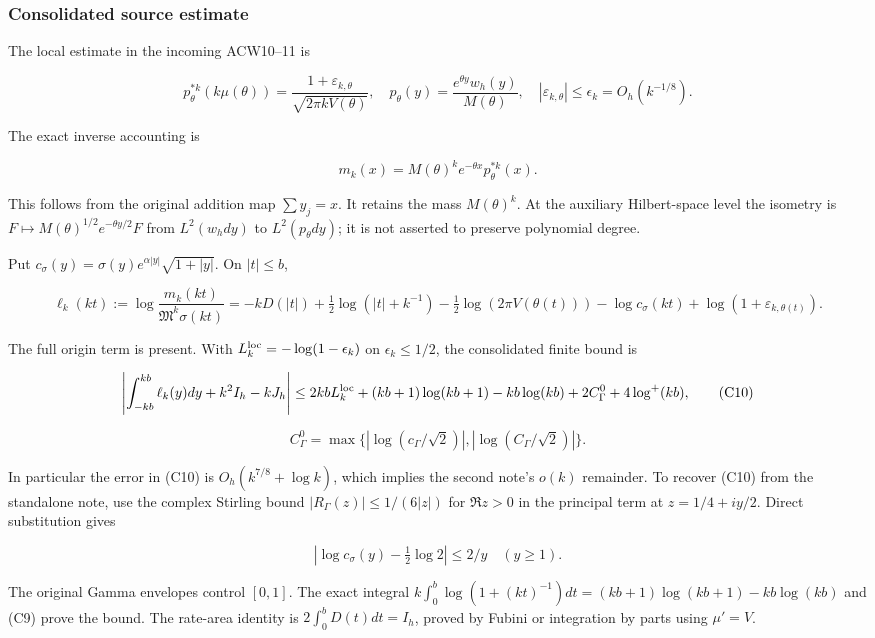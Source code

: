 \documentclass[11pt,a4paper]{article}
\begin{document}
\subsubsection{Consolidated source estimate}\label{loc:consolidated-source-estimate}

The local estimate in the incoming ACW10--11 is

\[
p_\theta^{*k}(k\mu(\theta))
=\frac{1+\varepsilon_{k,\theta}}{\sqrt{2\pi kV(\theta)}},
\quad p_\theta(y)=\frac{e^{\theta y}w_h(y)}{M(\theta)},
\quad |\varepsilon_{k,\theta}|\le\epsilon_k=O_h(k^{-1/8}).
\tag{C7}
\]

The exact inverse accounting is

\[
m_k(x)=M(\theta)^k e^{-\theta x}p_\theta^{*k}(x).
\tag{C8}
\]

This follows from the original addition map \(\sum y_j=x\). It retains the mass \(M(\theta)^k\). At the auxiliary Hilbert-space level the isometry is
\(F\mapsto M(\theta)^{1/2}e^{-\theta y/2}F\) from \(L^2(w_hdy)\) to \(L^2(p_\theta dy)\); it is not asserted to preserve polynomial degree.

Put \(c_\sigma(y)=\sigma(y)e^{\alpha|y|}\sqrt{1+|y|}\). On \(|t|\le b\),

\[
\ell_k(kt):=\log\frac{m_k(kt)}{\mathfrak M^k\sigma(kt)}
=-kD(|t|)+\tfrac12\log(|t|+k^{-1})
-\tfrac12\log(2\pi V(\theta(t)))-\log c_\sigma(kt)
+\log(1+\varepsilon_{k,\theta(t)}).
\tag{C9}
\]

The full origin term is present. With \(L_k^{\rm loc}=-\log(1-\epsilon_k)\) on \(\epsilon_k\le1/2\), the consolidated finite bound is

\[
\left|\int_{-kb}^{kb}\ell_k(y)dy+k^2I_h-kJ_h\right|
\le 2kbL_k^{\rm loc}+(kb+1)\log(kb+1)-kb\log(kb)
+2C_\Gamma^0+4\log^+(kb),
\tag{C10}
\]

\[
C_\Gamma^0=\max\{|\log(c_\Gamma/\sqrt2)|,
|\log(C_\Gamma/\sqrt2)|\}.
\]

In particular the error in (C10) is \(O_h(k^{7/8}+\log k)\), which implies the second note's \(o(k)\) remainder. To recover (C10) from the standalone note, use the complex Stirling bound
\(|R_\Gamma(z)|\le1/(6|z|)\) for \(\Re z>0\) in the principal term at \(z=1/4+iy/2\). Direct substitution gives

\[
|\log c_\sigma(y)-\tfrac12\log2|\le2/y\quad(y\ge1).
\]

The original Gamma envelopes control \([0,1]\). The exact integral
\(k\int_0^b\log(1+(kt)^{-1})dt
=(kb+1)\log(kb+1)-kb\log(kb)\)
and (C9) prove the bound. The rate-area identity is
\(2\int_0^bD(t)dt=I_h\), proved by Fubini or integration by parts using \(\mu'=V\).
\end{document}
